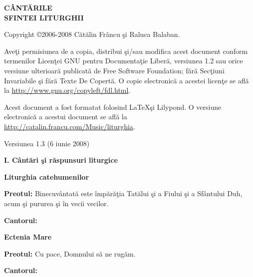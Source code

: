 \documentclass[11pt,letterpaper]{book} \usepackage{ucs}
\newcommand{\mychapter}[1]{\begin{center}{\Huge \bf #1}\end{center}}
\newcommand{\mysection}[1]{\begin{center}{\Large \bf #1}\end{center}}
\begin{document}
  \vspace*{-3in}

  \begin{center}
    {\Huge \bf CÂNTĂRILE\\
      \vspace{0.3in}
      SFINTEI \hspace{0.1in} LITURGHII}
  \end{center}
  \pagebreak

  \begin{footnotesize}
    Copyright \copyright 2006-2008 Cătălin Frâncu şi Raluca Balaban.
    
    Aveţi permisiunea de a copia, distribui şi/sau modifica acest
    document conform termenilor Licenţei GNU pentru Documentaţie
    Liberă, versiunea 1.2 sau orice versiune ulterioară publicată de
    Free Software Foundation; fără Secţiuni Invariabile şi fără Texte
    De Copertă. O copie electronică a acestei licenţe se află la
    \href{http://www.gnu.org/copyleft/fdl.html}
         {http://www.gnu.org/copyleft/fdl.html}.

    Acest document a fost formatat folosind \LaTeX şi Lilypond. O
    versiune electronică a acestui document se află la \\
    \href{http://catalin.francu.com/Music/liturghia}
         {http://catalin.francu.com/Music/liturghia}.

    Versiunea 1.3 (6 iunie 2008)
  \end{footnotesize}
  \pagebreak

  \pagestyle{headings}
  
  \mychapter{I. Cântări şi răspunsuri liturgice}

  \mysection{Liturghia catehumenilor}
  
  {\bf Preotul:} Binecuvântată este împărăţia Tatălui şi a Fiului şi a
  Sfântului Duh, acum şi pururea şi în vecii vecilor.

  {\bf Cantorul:}
  \begin{center}
  \end{center}

  \vspace{0.3in}

  \mysection{Ectenia Mare}

  {\bf Preotul:} Cu pace, Domnului să ne rugăm.

  {\bf Cantorul:}
  \begin{center}
  \end{center}
  \pagebreak
\end{document}
